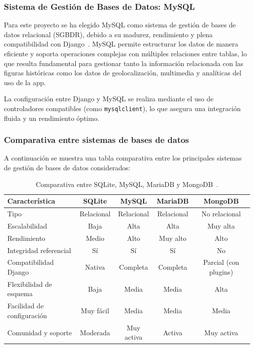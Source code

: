\subsubsection{Sistema de Gestión de Bases de Datos: MySQL}

Para este proyecto se ha elegido MySQL como sistema de gestión de bases de datos relacional (SGBDR), debido a su madurez, rendimiento y plena compatibilidad con Django~\cite{oracle2023}. MySQL permite estructurar los datos de manera eficiente y soporta operaciones complejas con múltiples relaciones entre tablas, lo que resulta fundamental para gestionar tanto la información relacionada con las figuras históricas como los datos de geolocalización, multimedia y analíticas del uso de la app.

La configuración entre Django y MySQL se realiza mediante el uso de controladores compatibles (como \texttt{mysqlclient}), lo que asegura una integración fluida y un rendimiento óptimo.

\subsubsection{Comparativa entre sistemas de bases de datos}

A continuación se muestra una tabla comparativa entre los principales sistemas de gestión de bases de datos considerados:

\begin{table}[H]
    \centering
    \begin{tabular}{|l|c|c|c|c|}
        \hline
        \textbf{Característica} & \textbf{SQLite} & \textbf{MySQL} & \textbf{MariaDB} & \textbf{MongoDB} \\ \hline
        Tipo & Relacional & Relacional & Relacional & No relacional \\ \hline
        Escalabilidad & Baja & Alta & Alta & Muy alta \\ \hline
        Rendimiento & Medio & Alto & Muy alto & Alto \\ \hline
        Integridad referencial & Sí & Sí & Sí & No \\ \hline
        Compatibilidad Django & Nativa & Completa & Completa & Parcial (con plugins) \\ \hline
        Flexibilidad de esquema & Baja & Media & Media & Alta \\ \hline
        Facilidad de configuración & Muy fácil & Media & Media & Media \\ \hline
        Comunidad y soporte & Moderada & Muy activa & Activa & Muy activa \\ \hline
    \end{tabular}
    \caption{Comparativa entre SQLite, MySQL, MariaDB y MongoDB~\cite{elmasri2017, mariadb2023, mongodb2024}.}
    \label{tabla:comparativa_bases_datos}
\end{table}

